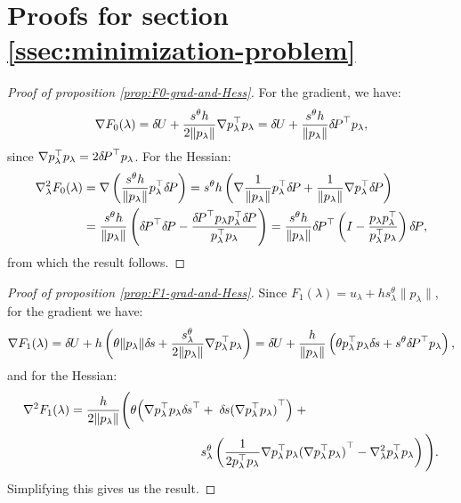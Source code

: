 \documentclass[smallcondensed]{svjour3}
\begin{document}
\section{Proofs for section\@
  \ref{ssec:minimization-problem}}\label{sec:minimization-proofs}

\begin{proof}[Proof of proposition \ref{prop:F0-grad-and-Hess}]
  For the gradient, we have:
  \begin{equation*}
    \nabla F_0(\lambda) = {\delta \hspace{-0.09em} U} + \frac{s^{\theta} h}{2 \|p_\lambda\|} \nabla p_\lambda^\top p_\lambda = {\delta \hspace{-0.09em} U} + \frac{s^{\theta} h}{\|p_\lambda\|} {\delta \hspace{-0.14em} P}^\top p_\lambda,
  \end{equation*}
  since
  $\nabla p_\lambda^\top p_\lambda = 2 {\delta \hspace{-0.14em} P}^\top
  p_\lambda$. For the Hessian:
  \begin{align*}
    \nabla^2_\lambda F_0(\lambda) &= \nabla \left(\frac{s^{\theta} h}{\|p_\lambda\|} p_\lambda^\top {\delta \hspace{-0.14em} P}\right) = s^{\theta} h \left(\nabla \frac{1}{\|p_\lambda\|} p_\lambda^\top {\delta \hspace{-0.14em} P} + \frac{1}{\|p_\lambda\|} \nabla p_\lambda^\top {\delta \hspace{-0.14em} P}\right) \\
    &= \frac{s^{\theta} h}{\|p_\lambda\|} \left({\delta \hspace{-0.14em} P}^\top {\delta \hspace{-0.14em} P} - \frac{{\delta \hspace{-0.14em} P}^\top p_\lambda p_\lambda^\top {\delta \hspace{-0.14em} P}}{p_\lambda^\top p_\lambda}\right) = \frac{s^{\theta} h}{\|p_\lambda\|} {\delta \hspace{-0.14em} P}^\top \left(I - \frac{p_\lambda p_\lambda^\top}{p_\lambda^\top p_\lambda}\right) {\delta \hspace{-0.14em} P},
  \end{align*}
  from which the result follows.
\end{proof}

\begin{proof}[Proof of proposition \ref{prop:F1-grad-and-Hess}]
  Since
  $F_1(\lambda) = u_\lambda + h s^{\theta}_\lambda \|p_\lambda\|$,
  for the gradient we have:
  \begin{equation*}
    \nabla F_1(\lambda) = {\delta \hspace{-0.09em} U} + h \left(\theta \|p_\lambda\| {\delta \hspace{-0.1em} s} + \frac{s^{\theta}_\lambda}{2\|p_\lambda\|} \nabla p_\lambda^\top p_\lambda\right) = {\delta \hspace{-0.09em} U} + \frac{h}{\|p_\lambda\|} \left(\theta p_\lambda^\top p_\lambda {\delta \hspace{-0.1em} s} + s^{\theta} {\delta \hspace{-0.14em} P}^\top p_\lambda\right),
  \end{equation*}
  and for the Hessian:
  \begin{equation*}
    \begin{aligned}
      \nabla^2 F_1(\lambda) = \frac{h}{2 \|p_\lambda\|} \Bigg(\theta \Big(\nabla p_\lambda^\top p_\lambda {\delta \hspace{-0.1em} s}^\top &+\; {\delta \hspace{-0.1em} s} {(\nabla p_\lambda^\top p_\lambda)}^\top\Big) \;+ \\
      &s^{\theta}_\lambda \left(\frac{1}{2 p_\lambda^\top p_\lambda} \nabla p_\lambda^\top p_\lambda {(\nabla p_\lambda^\top p_\lambda)}^\top - \nabla^2_\lambda p_\lambda^\top p_\lambda\right) \Bigg).
    \end{aligned}
  \end{equation*}
  Simplifying this gives us the result.
\end{proof}
\end{document}
